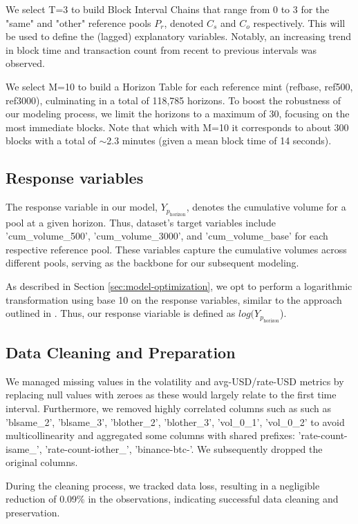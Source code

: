 \documentclass{article}
\begin{document}
We select T=3 to build Block Interval Chains that range from 0 to 3 for the "same" and "other" reference pools \(P_r\), denoted \(C_s\) and \(C_o\) respectively. This will be used to define the (lagged) explanatory variables. Notably, an increasing trend in block time and transaction count from recent to previous intervals was observed.

We select M=10 to build a Horizon Table for each reference mint (refbase, ref500, ref3000), culminating in a total of 118,785 horizons. To boost the robustness of our modeling process, we limit the horizons to a maximum of 30, focusing on the most immediate blocks. Note that which with M=10 it corresponds to about 300 blocks with a total of $\sim$2.3 minutes (given a mean block time of 14 seconds).

\subsection{Response variables}

The response variable in our model, \(Y_{p_{\text{horizon}}}\), denotes the cumulative volume for a pool at a given horizon. Thus, dataset's target variables include 'cum\_volume\_500', 'cum\_volume\_3000', and 'cum\_volume\_base' for each respective reference pool. These variables capture the cumulative volumes across different pools, serving as the backbone for our subsequent modeling.

As described in Section \ref{sec:model-optimization}, we opt to perform a logarithmic transformation using base 10 on the response variables, similar to the approach outlined in \cite{Miori2023}. 
Thus, our response viariable is defined as \(log(Y_{p_{\text{horizon}}}\)).


\subsection{Data Cleaning and Preparation}

We managed missing values in the volatility and avg-USD/rate-USD metrics by replacing null values with zeroes as these would largely relate to the first time interval. Furthermore, we removed highly correlated columns such as such as 'blsame\_2', 'blsame\_3', 'blother\_2', 'blother\_3', 'vol\_0\_1', 'vol\_0\_2' to avoid multicollinearity and aggregated some columns with shared prefixes: 'rate-count-isame\_', 'rate-count-iother\_', 'binance-btc-'. We subsequently dropped the original columns.

During the cleaning process, we tracked data loss, resulting in a negligible reduction of 0.09\% in the observations, indicating successful data cleaning and preservation.
\end{document}

